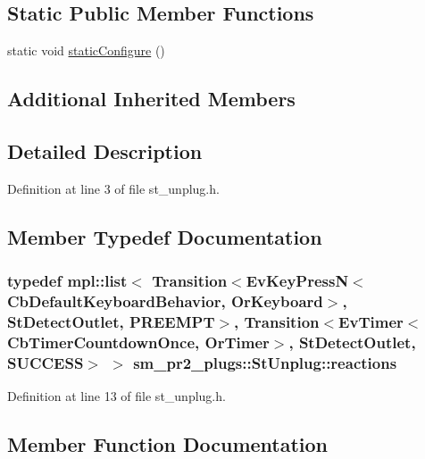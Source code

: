 \subsection*{Static Public Member Functions}
\begin{DoxyCompactItemize}
\item 
static void \hyperlink{structsm__pr2__plugs_1_1StUnplug_aef539ea0c8d9ebf2ee46a69ca5db75be}{static\+Configure} ()
\end{DoxyCompactItemize}
\subsection*{Additional Inherited Members}


\subsection{Detailed Description}


Definition at line 3 of file st\+\_\+unplug.\+h.



\subsection{Member Typedef Documentation}
\subsubsection[{\texorpdfstring{reactions}{reactions}}]{\setlength{\rightskip}{0pt plus 5cm}typedef mpl\+::list$<$ Transition$<$Ev\+Key\+PressN$<$Cb\+Default\+Keyboard\+Behavior, {\bf Or\+Keyboard}$>$, {\bf St\+Detect\+Outlet}, {\bf P\+R\+E\+E\+M\+PT}$>$, Transition$<$Ev\+Timer$<$Cb\+Timer\+Countdown\+Once, {\bf Or\+Timer}$>$, {\bf St\+Detect\+Outlet}, {\bf S\+U\+C\+C\+E\+SS}$>$ $>$ {\bf sm\+\_\+pr2\+\_\+plugs\+::\+St\+Unplug\+::reactions}}\hypertarget{structsm__pr2__plugs_1_1StUnplug_a5e2311ff9af5d5f6391dc9bec1cb477f}{}\label{structsm__pr2__plugs_1_1StUnplug_a5e2311ff9af5d5f6391dc9bec1cb477f}


Definition at line 13 of file st\+\_\+unplug.\+h.



\subsection{Member Function Documentation}

